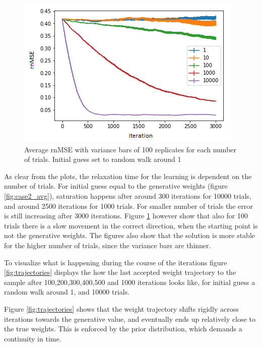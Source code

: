 \begin{figure}[hbt!]
\caption{Average rnMSE with variance bars of 100 replicates for each number of trials. Initial guess set to random walk around 1}
\label{fig:MSE2}
    \centering
    \includegraphics[scale=0.8]{fig/MSE_starting_away_wa.png}
\end{figure}

As clear from the plots, the relaxation time for the learning is dependent on the number of trials. For initial guess equal to the generative weights (figure \ref{fig:case2_avg}), saturation happens after around 300 iterations for 10000 trials, and around 2500 iterations for 1000 trials. For smaller number of trials the error is still increasing after 3000 iterations. Figure \ref{fig:MSE2} however show that also for 100 trials there is a slow movement in the correct direction, when the starting point is not the generative weights. The figures also show that the solution is more stable for the higher number of trials, since the variance bars are thinner.  

To visualize what is happening during the course of the iterations figure \ref{fig:trajectories} displays the how the last accepted weight trajectory to the sample after 100,200,300,400,500 and 1000 iterations looks like, for initial guess a random walk around 1, and 10000 trials. 

Figure \ref{fig:trajectories} shows that the weight trajectory shifts rigidly across iterations towards the generative value, and eventually ends up relatively close to the true weights. This is enforced by the prior distribution, which demands a continuity in time. 

